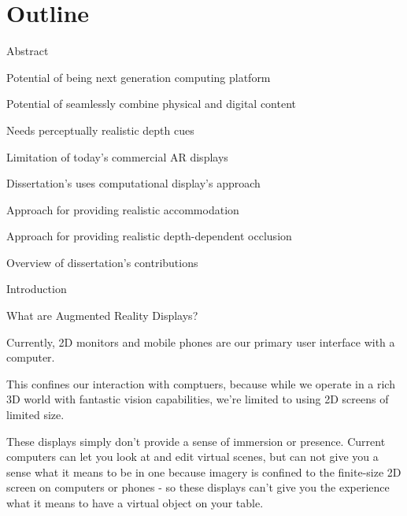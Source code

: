 \section{Outline}
\begin{compact_itemize}
\item Abstract
    \begin{compact_itemize}
    \item Potential of being next generation computing platform
    \item Potential of seamlessly combine physical and digital content
    \item Needs perceptually realistic depth cues
    \item Limitation of today's commercial AR displays
    \item Dissertation's uses computational display's approach
    \item Approach for providing realistic accommodation
    \item Approach for providing realistic depth-dependent occlusion
    \item Overview of dissertation's contributions
    \end{compact_itemize}
\item Introduction
    \begin{compact_itemize}
    \item What are Augmented Reality Displays?
        \begin{compact_todolist}
        \item Currently, 2D monitors and mobile phones are our primary user interface with a computer.
        \item This confines our interaction with comptuers, because while we operate in a rich 3D world with fantastic vision capabilities, we're limited to using 2D screens of limited size. 
        \item These displays simply don't provide a sense of immersion or presence. Current computers can let you look at and edit virtual scenes, but can not give you a sense what it means to be in one because imagery is confined to the finite-size 2D screen on computers or phones - so these displays can't give you the experience what it means to have a virtual object on your table. 
        \item {}

\end{compact_todolist}
\end{compact_itemize}
\end{compact_itemize}
